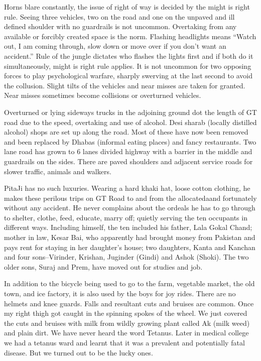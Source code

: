 Horns blare constantly, the issue of right of way is decided by the might
is right rule. Seeing three vehicles, two on the road and one on the
unpaved and ill defined shoulder with no guardrails is not uncommon.
Overtaking from any available or forcibly created space is the norm.
Flashing headlights means “Watch out, I am coming through, slow down or
move over if you don't want an accident.” Rule of the jungle dictates who
flashes the lights first and if both do it simultaneously, might is right
rule applies. It is not uncommon for two opposing forces to play
psychological warfare, sharply swerving at the last second to avoid the
collusion. Slight tilts of the vehicles and near misses are taken for
granted. Near misses sometimes become collisions or overturned vehicles.

Overturned or lying sideways trucks in the adjoining ground dot the length
of GT road due to the speed, overtaking and use of alcohol. Desi sharab
(locally distilled alcohol) shops are set up along the road. Most of these
have now been removed and been replaced by Dhabas (informal eating places)
and fancy restaurants. Two lane road has grown to 6 lanes divided highway
with a barrier in the middle and guardrails on the sides. There are paved
shoulders and adjacent service roads for slower traffic, animals and
walkers.

PitaJi has no such luxuries. Wearing a hard khaki hat, loose cotton
clothing, he makes these perilous trips on GT Road to and from the
allocatedaand fortunately without any accident. He never complains about
the ordeals he has to go through to shelter, clothe, feed, educate, marry
off; quietly serving the ten occupants in different ways. Including
himself, the ten included his father, Lala Gokal Chand; mother in law,
Kesar Bai, who apparently had brought money from Pakistan and pays rent
for staying in her daughter's house; two daughters, Kanta and Kanchan and
four sons--Virinder, Krishan, Juginder (Gindi) and Ashok (Shoki). The two
older sons, Suraj and Prem, have moved out for studies and job.

In addition to the bicycle being used to go to the farm, vegetable market,
the old town, and ice factory, it is also used by the boys for joy rides.
There are no helmets and knee guards. Falls and resultant cuts and bruises
are common. Once my right thigh got caught in the spinning spokes of the
wheel. We just covered the cuts and bruises with milk from wildly growing
plant called Ak (milk weed) and plain dirt. We have never heard the word
Tetanus. Later in medical college we had a tetanus ward and learnt that it
was a prevalent and potentially fatal disease. But we turned out to be the
lucky ones.

